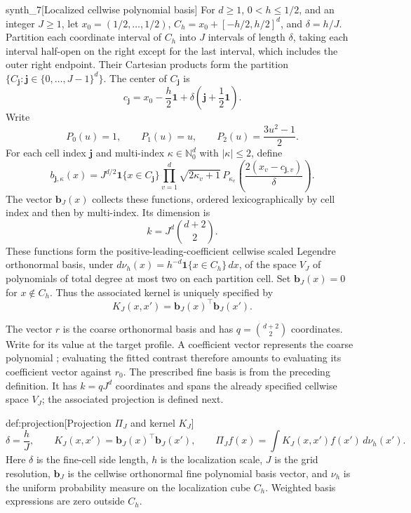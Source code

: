 \begin{definitionv}{synth_7}[Localized cellwise polynomial basis]
For \(d\ge1\), \(0<h\le1/2\), and an integer \(J\ge1\), let \(x_0=(1/2,\ldots,1/2)\), \(C_h=x_0+[-h/2,h/2]^d\), and \(\delta=h/J\). Partition each coordinate interval of \(C_h\) into \(J\) intervals of length \(\delta\), taking each interval half-open on the right except for the last interval, which includes the outer right endpoint. Their Cartesian products form the partition \(\{C_{\mathbf j}:\mathbf j\in\{0,\ldots,J-1\}^d\}\). The center of \(C_{\mathbf j}\) is
\[
c_{\mathbf j}=x_0-\frac h2\mathbf1+\delta\left(\mathbf j+\frac12\mathbf1\right).
\]
Write
\[
P_0(u)=1,\qquad P_1(u)=u,\qquad P_2(u)=\frac{3u^2-1}{2}.
\]
For each cell index \(\mathbf j\) and multi-index \(\kappa\in\mathbb N_0^d\) with \(|\kappa|\le2\), define
\[
b_{\mathbf j,\kappa}(x)
=
J^{d/2}\mathbf1\{x\in C_{\mathbf j}\}
\prod_{v=1}^d
\sqrt{2\kappa_v+1}\,
P_{\kappa_v}\!\left(\frac{2(x_v-c_{\mathbf j,v})}{\delta}\right).
\]
The vector \(\mathbf b_J(x)\) collects these functions, ordered lexicographically by cell index and then by multi-index. Its dimension is
\[
k=J^d\binom{d+2}{2}.
\]
These functions form the positive-leading-coefficient cellwise scaled Legendre orthonormal basis, under \(d\nu_h(x)=h^{-d}\mathbf1\{x\in C_h\}\,dx\), of the space \(V_J\) of polynomials of total degree at most two on each partition cell. Set \(\mathbf b_J(x)=0\) for \(x\notin C_h\). Thus the associated kernel is uniquely specified by
\[
K_J(x,x')=\mathbf b_J(x)^\top\mathbf b_J(x').
\]
\end{definitionv}



The vector \(r\) is the coarse orthonormal basis and has \(q=\binom{d+2}{2}\) coordinates. Write  for its value at the target profile. A coefficient vector  represents the coarse polynomial ; evaluating the fitted contrast therefore amounts to evaluating its coefficient vector against \(r_0\). The prescribed fine basis is  from the preceding definition. It has \(k=qJ^d\) coordinates and spans the already specified cellwise space \(V_J\); the associated projection is defined next.

\begin{definitionv}{def:projection}[Projection \(\Pi_J\) and kernel \(K_J\)]
\[
\delta=\frac hJ,\qquad
K_J(x,x')=\mathbf b_J(x)^\top \mathbf b_J(x'),\qquad
\Pi_Jf(x)=\int K_J(x,x')f(x')\,d\nu_h(x').
\]
Here \(\delta\) is the fine-cell side length, \(h\) is the localization scale, \(J\) is the grid resolution, \(\mathbf b_J\) is the cellwise orthonormal fine polynomial basis vector, and \(\nu_h\) is the uniform probability measure on the localization cube \(C_h\). Weighted basis expressions are zero outside \(C_h\).
\end{definitionv}

